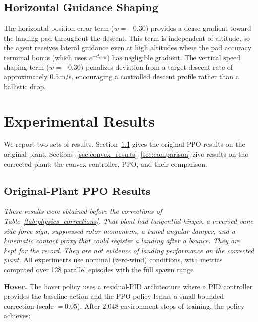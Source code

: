 \documentclass[conference]{IEEEtran}
\begin{document}
\subsection{Horizontal Guidance Shaping}

The horizontal position error term ($w = -0.30$) provides a dense gradient toward the landing pad throughout the descent. This term is independent of altitude, so the agent receives lateral guidance even at high altitudes where the pad accuracy terminal bonus (which uses $e^{-d_{\text{horiz}}}$) has negligible gradient. The vertical speed shaping term ($w = -0.30$) penalizes deviation from a target descent rate of approximately $0.5$\,m/s, encouraging a controlled descent profile rather than a ballistic drop.


\section{Experimental Results}

We report two sets of results. Section~\ref{sec:legacy_results} gives the original PPO results on the original plant. Sections~\ref{sec:convex_results}--\ref{sec:comparison} give results on the corrected plant: the convex controller, PPO, and their comparison.

\subsection{Original-Plant PPO Results}
\label{sec:legacy_results}

\emph{These results were obtained before the corrections of Table~\ref{tab:physics_corrections}. That plant had tangential hinges, a reversed vane side-force sign, suppressed rotor momentum, a tuned angular damper, and a kinematic contact proxy that could register a landing after a bounce. They are kept for the record. They are not evidence of landing performance on the corrected plant.} All experiments use nominal (zero-wind) conditions, with metrics computed over 128 parallel episodes with the full spawn range.

\textbf{Hover.} The hover policy uses a residual-PID architecture where a PID controller provides the baseline action and the PPO policy learns a small bounded correction (scale $= 0.05$). After 2{,}048 environment steps of training, the policy achieves:
\end{document}
